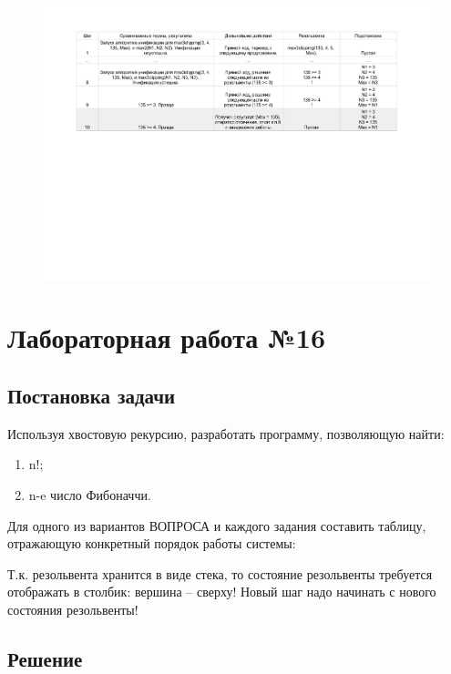 \documentclass[12pt]{report}
\begin{document}
\begin{figure}[H]
	\begin{center}
		\includegraphics[scale=0.7]{imgs/table_15_02.pdf}
	\end{center}
\end{figure}

\chapter*{Лабораторная работа №16}

\section*{Постановка задачи}

Используя хвостовую рекурсию, разработать программу, позволяющую найти:

\begin{enumerate}
	\item n!;
	\item n-e число Фибоначчи.
\end{enumerate}

Для одного из вариантов ВОПРОСА и каждого задания составить таблицу,
отражающую конкретный порядок работы системы:

Т.к. резольвента хранится в виде стека, то состояние резольвенты требуется отображать
в столбик: вершина – сверху! Новый шаг надо начинать с нового состояния резольвенты!

\newpage
\section*{Решение}
\end{document}
